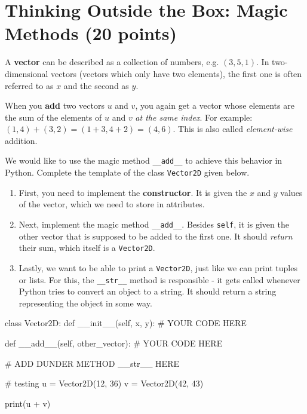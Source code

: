 \section{Thinking Outside the Box: Magic Methods (20 points)}

A {\bf vector} can be described as a collection of numbers, e.g. $(3, 5, 1)$. In two-dimensional vectors (vectors which only have two elements), the first one is often referred to as $x$ and the second as $y$.

\vspace{1em}

\noindent When you {\bf add} two vectors $u$ and $v$, you again get a vector whose elements are the sum of the elements of $u$ and $v$ {\it at the same index}. For example: $(1, 4) + (3, 2) = (1+3, 4+2) = (4, 6)$. This is also called {\it element-wise} addition.

\vspace{1em}

\noindent We would like to use the magic method {\tt \_\_add\_\_} to achieve this behavior in Python. Complete the template of the class {\tt Vector2D} given below.

\begin{enumerate}
    \item First, you need to implement the {\bf constructor}. It is given the $x$ and $y$ values of the vector, which we need to store in attributes.
    \item Next, implement the magic method {\tt \_\_add\_\_}. Besides {\tt self}, it is given the other vector that is supposed to be added to the first one. It should {\it return} their sum, which itself is a {\tt Vector2D}.
    \item Lastly, we want to be able to print a {\tt Vector2D}, just like we can print tuples or lists. For this, the {\tt \_\_str\_\_} method is responsible - it gets called whenever Python tries to convert an object to a string. It should return a string representing the object in some way.
\end{enumerate}

\begin{pythoncode}
class Vector2D:
    def __init__(self, x, y):
        # YOUR CODE HERE

    def __add__(self, other_vector):
        # YOUR CODE HERE

    # ADD DUNDER METHOD __str__ HERE

# testing
u = Vector2D(12, 36)
v = Vector2D(42, 43)

print(u + v)
\end{pythoncode}

